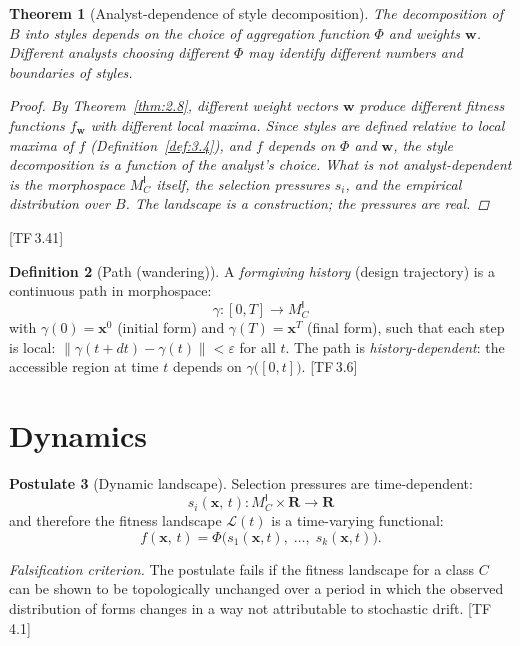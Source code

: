 \documentclass[10pt]{article}
\theoremstyle{definition}
\newtheorem{definition}{Definition}[section]
\newtheorem{postulate}[definition]{Postulate}
\theoremstyle{plain}
\newtheorem{theorem}[definition]{Theorem}
\theoremstyle{remark}
\newcommand{\MC}{M^{\mathsf{I}}_C}          %
\providecommand{\R}{}
\renewcommand{\R}{\mathbf{R}}               %
\newcommand{\FitLand}{\mathcal{L}}           %
\newcommand{\norm}[1]{\lVert #1 \rVert}
\newcommand{\TF}[1]{\textnormal{[TF\,#1]}}  %
\begin{document}
\begin{theorem}[Analyst-dependence of style decomposition]\label{thm:3.5}
The decomposition of $B$ into styles depends on the choice of
aggregation function $\Phi$ and weights $\bm{w}$. Different analysts
choosing different $\Phi$ may identify different numbers and boundaries
of styles.

\begin{proof}
By Theorem~\ref{thm:2.8}, different weight vectors $\bm{w}$ produce
different fitness functions $f_{\bm{w}}$ with different local maxima.
Since styles are defined relative to local maxima of $f$
(Definition~\ref{def:3.4}), and $f$ depends on $\Phi$ and $\bm{w}$,
the style decomposition is a function of the analyst's choice.
What is \emph{not} analyst-dependent is the morphospace $\MC$ itself,
the selection pressures $s_i$, and the empirical distribution over $B$.
The landscape is a construction; the pressures are real. \qedhere
\end{proof}
\end{theorem}

\TF{3.41}

\begin{definition}[Path (wandering)]\label{def:3.6}
A \emph{formgiving history} (design trajectory) is a continuous path
in morphospace:
\[
  \gamma : [0, T] \longrightarrow \MC
\]
with $\gamma(0) = \bm{x}^0$ (initial form) and $\gamma(T) = \bm{x}^T$
(final form), such that each step is local:
$\norm{\gamma(t + dt) - \gamma(t)} < \varepsilon$ for all $t$.
The path is \emph{history-dependent}: the accessible region at time $t$
depends on $\gamma\bigl([0, t]\bigr)$. \TF{3.6}
\end{definition}


\newpage
\section{Dynamics}\label{sec:dynamics}

\begin{postulate}[Dynamic landscape]\label{post:4.1}
Selection pressures are time-dependent:
\[
  s_i(\bm{x},\, t) : \MC \times \R \longrightarrow \R
\]
and therefore the fitness landscape $\FitLand(t)$ is a time-varying
functional:
\[
  f(\bm{x},\, t) = \Phi\bigl(s_1(\bm{x}, t),\; \ldots,\;
  s_k(\bm{x}, t)\bigr).
\]

\medskip\noindent
\textit{Falsification criterion.}
The postulate fails if the fitness landscape for a class $C$ can be
shown to be topologically unchanged over a period in which the observed
distribution of forms changes in a way not attributable to stochastic
drift. \TF{4.1}
\end{postulate}
\end{document}
